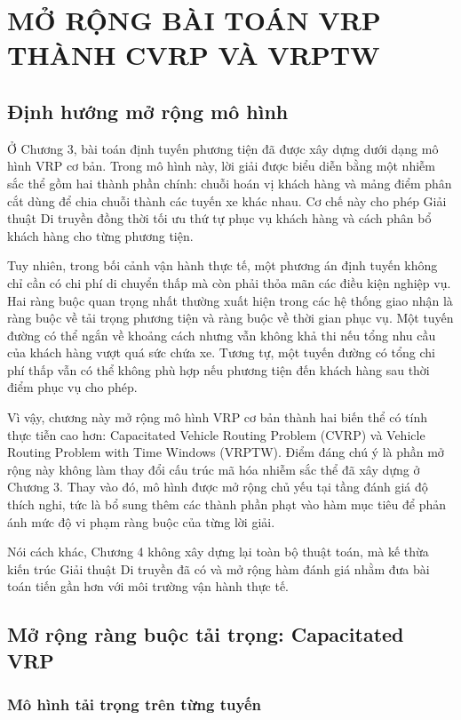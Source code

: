 \documentclass[12pt,a4paper]{article}
\numberwithin{figure}{subsection}
\begin{document}
\section{MỞ RỘNG BÀI TOÁN VRP THÀNH CVRP VÀ VRPTW}

\subsection{Định hướng mở rộng mô hình}

Ở Chương 3, bài toán định tuyến phương tiện đã được xây dựng dưới dạng mô hình VRP cơ bản. Trong mô hình này, lời giải được biểu diễn bằng một nhiễm sắc thể gồm hai thành phần chính: chuỗi hoán vị khách hàng và mảng điểm phân cắt dùng để chia chuỗi thành các tuyến xe khác nhau. Cơ chế này cho phép Giải thuật Di truyền đồng thời tối ưu thứ tự phục vụ khách hàng và cách phân bổ khách hàng cho từng phương tiện.

Tuy nhiên, trong bối cảnh vận hành thực tế, một phương án định tuyến không chỉ cần có chi phí di chuyển thấp mà còn phải thỏa mãn các điều kiện nghiệp vụ. Hai ràng buộc quan trọng nhất thường xuất hiện trong các hệ thống giao nhận là ràng buộc về tải trọng phương tiện và ràng buộc về thời gian phục vụ. Một tuyến đường có thể ngắn về khoảng cách nhưng vẫn không khả thi nếu tổng nhu cầu của khách hàng vượt quá sức chứa xe. Tương tự, một tuyến đường có tổng chi phí thấp vẫn có thể không phù hợp nếu phương tiện đến khách hàng sau thời điểm phục vụ cho phép.

Vì vậy, chương này mở rộng mô hình VRP cơ bản thành hai biến thể có tính thực tiễn cao hơn: Capacitated Vehicle Routing Problem (CVRP) và Vehicle Routing Problem with Time Windows (VRPTW). Điểm đáng chú ý là phần mở rộng này không làm thay đổi cấu trúc mã hóa nhiễm sắc thể đã xây dựng ở Chương 3. Thay vào đó, mô hình được mở rộng chủ yếu tại tầng đánh giá độ thích nghi, tức là bổ sung thêm các thành phần phạt vào hàm mục tiêu để phản ánh mức độ vi phạm ràng buộc của từng lời giải.

Nói cách khác, Chương 4 không xây dựng lại toàn bộ thuật toán, mà kế thừa kiến trúc Giải thuật Di truyền đã có và mở rộng hàm đánh giá nhằm đưa bài toán tiến gần hơn với môi trường vận hành thực tế.

\subsection{Mở rộng ràng buộc tải trọng: Capacitated VRP}

\subsubsection{Mô hình tải trọng trên từng tuyến}
\end{document}
